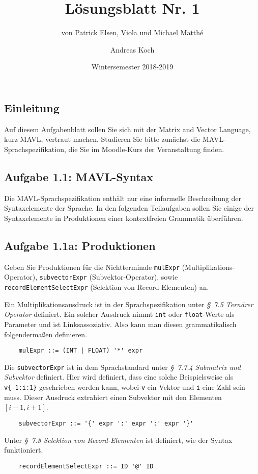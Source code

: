 \documentclass[
  ngerman,
  DIV=14
]{scrartcl}
\title{Lösungsblatt Nr. 1}
\date{Wintersemester 2018-2019}
\author{Andreas Koch}
\subtitle{von Patrick Elsen, Viola und Michael Matthé}
\begin{document}
\maketitle

\subsection*{Einleitung}

Auf diesem Aufgabenblatt sollen Sie sich mit der Matrix and Vector Language, kurz MAVL, vertraut machen. Studieren Sie bitte zunächst die MAVL-Sprachspezifikation, die Sie im Moodle-Kurs der Veranstaltung finden.

\subsection*{Aufgabe 1.1: MAVL-Syntax}

Die MAVL-Sprachspezifikation enthält nur eine informelle Beschreibung der Syntaxelemente der Sprache. In den folgenden Teilaufgaben sollen Sie einige der Syntaxelemente in Produktionen einer kontextfreien Grammatik überführen.

\subsection*{Aufgabe 1.1a: Produktionen}

Geben Sie Produktionen für die Nichtterminale \texttt{mulExpr} (Multiplikations-Operator), \texttt{subvectorExpr} (Subvektor-Operator), sowie \texttt{recordElementSelectExpr} (Selektion von Record-Elementen) an.

\bigskip\noindent
Ein Multiplikationsausdruck ist in der Sprachspezifikation unter \emph{§~7.5 Ternärer Operator} definiert. Ein solcher Ausdruck nimmt \verb|int| oder \verb|float|-Werte als Parameter und ist Linksassoziativ. Also kann man diesen grammatikalisch folgendermaßen definieren.
\begin{verbatim}
    mulExpr ::= (INT | FLOAT) '*' expr
\end{verbatim}
Die \verb|subvectorExpr| ist in dem Sprachstandard unter \emph{§~7.7.4 Submatrix und Subvektor} definiert. Hier wird definiert, dass eine solche Beispielsweise als \verb|v{-1:i:1}| geschrieben werden kann, wobei \verb|v| ein Vektor und \verb|i| eine Zahl sein muss. Dieser Ausdruck extrahiert einen Subvektor mit den Elementen $[i-1, i+1]$. 
\begin{verbatim}
    subvectorExpr ::= '{' expr ':' expr ':' expr '}'  
\end{verbatim}
Unter \emph{§~7.8 Selektion von Record-Elementen} ist definiert, wie der Syntax funktioniert.
\begin{verbatim}
    recordElementSelectExpr ::= ID '@' ID  
\end{verbatim}
\end{document}
